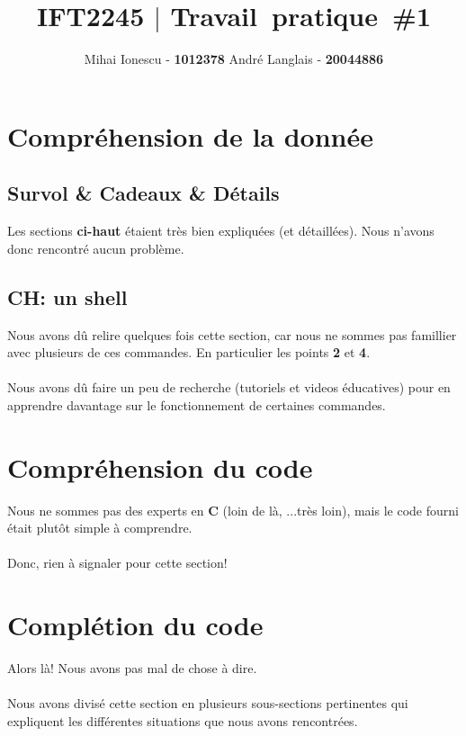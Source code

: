 \documentclass{article}
\title{IFT2245 $\mid$ Travail\ pratique\ \#1 }
\author{Mihai Ionescu - \textbf{1012378} André Langlais - \textbf{20044886}}
\begin{document}
\maketitle


\section{Compréhension de la donnée}

\subsection{Survol \& Cadeaux \& Détails}
Les sections \textbf{ci-haut} étaient très bien expliquées (et détaillées). Nous n'avons donc rencontré aucun problème.

\subsection{CH: un shell}
Nous avons dû relire quelques fois cette section,  car nous ne sommes pas famillier avec plusieurs de ces commandes. En particulier les points \textbf{2} et \textbf{4}.
\\\\
Nous avons dû faire un peu de recherche (tutoriels et videos éducatives) pour en apprendre davantage sur le fonctionnement de certaines commandes.

\section{Compréhension du code}

Nous ne sommes pas des experts en \textbf{C} (loin de là, ...très loin), mais le code fourni était plutôt simple à comprendre.
\\\\
Donc, rien à signaler pour cette section!

\section{Complétion du code}

Alors là! Nous avons pas mal de chose à dire.
\\\\
Nous avons divisé cette section en plusieurs sous-sections pertinentes qui expliquent les différentes situations que nous avons rencontrées.
\end{document}
